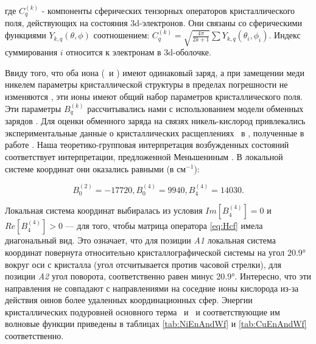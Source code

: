 где $C_{q}^{(k)}$ - компоненты сферических тензорных операторов кристаллического поля, действующих на состояния 3d-электронов. Они связаны со сферическими функциями $Y_{k,q}\left( \theta,\phi \right)$ соотношением: $C_{q}^{(k)}=\sqrt{\frac{4\pi}{2k+1}}\sum Y_{k,q}\left( \theta_{i},\phi_{i} \right)$. Индекс суммирования $i$ относится к электронам в 3d-оболочке.

Ввиду того, что оба иона (\cu\ и \niIon) имеют одинаковый заряд, а при замещении меди никелем параметры кристаллической структуры в пределах погрешности не изменяются \cite{Khanh2013}, эти ионы имеют общий набор параметров кристаллического поля.
Эти параметры $B_{q}^{(k)}$ рассчитывались нами с использованием модели обменных зарядов \cite{Malkin1987}. Для оценки обменного заряда на связях никель-кислород привлекались экспериментальные данные о кристаллических расщеплениях \cu\ в \cbo, полученные в работе \cite{Pisarev2011}. Наша теоретико-групповая интерпретация возбужденных состояний соответствует интерпретации, предложенной Меньшениным \cite{Menshenin2017}. В локальной системе координат они оказались равными (в см$^{-1}$):

\begin{equation}
	\label{eq:CrystParams}
	B_{0}^{(2)}=-17720, B_{0}^{(4)}=9940, B_{4}^{(4)}=14030.
\end{equation}

Локальная система координат выбиралась из условия $Im\left[ B_{4}^{(4)} \right]=0$ и $Re\left[ B_{4}^{(4)} \right]>0$ --- для того, чтобы матрица оператора \cref{eq:Hcf} имела диагональный вид. Это означает, что для позиции \textit{A1} локальная система координат повернута относительно кристаллографической системы на угол \ang{20.9} вокруг оси с кристалла (угол отсчитывается против часовой стрелки), для позиции \textit{A2} угол поворота, соответственно равен минус \ang{20.9}. Интересно, что эти направления не совпадают с направлениями на соседние ионы кислорода из-за действия оинов более удаленных координационных сфер. Энергии кристаллических подуровней основного терма \cud\ и \nif\ и соответствующие им волновые функции приведены в таблицах \cref{tab:NiEnAndWf} и \cref{tab:CuEnAndWf} соответственно.

